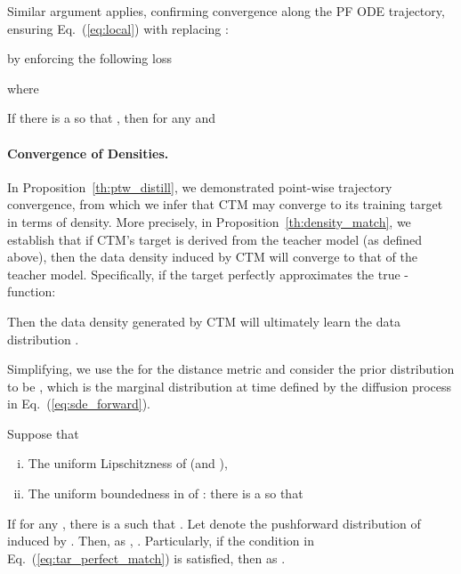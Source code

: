 \documentclass{article} \usepackage{iclr2024_coNFErence,times}
\def\eqref#1{equation~\ref{#1}}
\def\eqref#1{(\ref{#1})}
\def\eqref#1{(\ref{#1})}
\theoremstyle{definition}
\theoremstyle{remark}
\begin{document}
Similar argument applies, confirming convergence along the PF ODE trajectory, ensuring Eq.~\eqref{eq:local} with  replacing :

by enforcing the following loss

where





\begin{proposition}\label{th:ptw_traj_distill}  If there is a  so that , then for any  and   


\end{proposition}



\paragraph{Convergence of Densities.} In Proposition~\ref{th:ptw_distill}, we demonstrated point-wise trajectory convergence, from which we infer that CTM may converge to its training target in terms of density. More precisely, in Proposition~\ref{th:density_match}, we establish that if CTM's target  is derived from the teacher model (as defined above), then the data density induced by CTM will converge to that of the teacher model. Specifically, if the target  perfectly approximates the true -function: 

Then the data density generated by CTM will ultimately learn the data distribution .

Simplifying, we use the  for the distance metric  and consider the prior distribution  to be , which is the marginal distribution at time  defined by the diffusion process in Eq.~\eqref{eq:sde_forward}.



\begin{proposition}\label{th:density_match}  Suppose that 
\begin{enumerate}[(i)]
        \item 
    The uniform Lipschitzness of  (and ),
    
    \item The uniform boundedness in  of : there is a  so that
    
\end{enumerate}
If for any , there is a  such that . Let  denote the pushforward distribution of  induced by . Then, as , . Particularly, if the condition in Eq.~\eqref{eq:tar_perfect_match} is satisfied, then  as .
\end{proposition}
\end{document}

